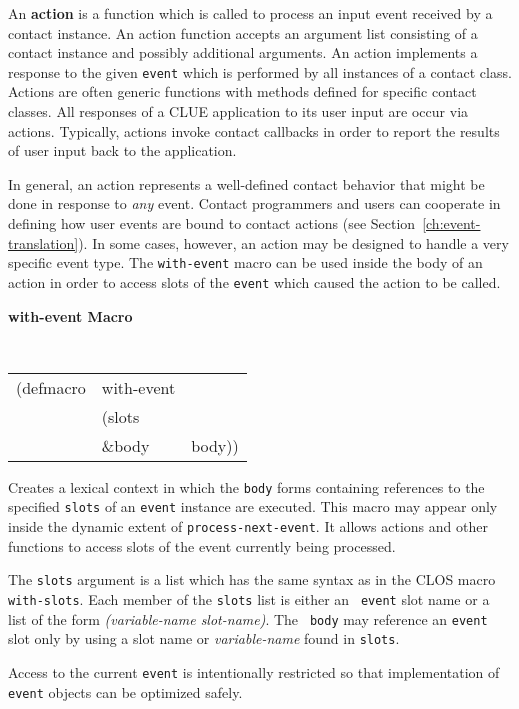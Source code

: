 
An {\bf action} is a function which is called to
process an input event received by a contact instance. An action function
accepts an argument list consisting of a contact instance and possibly
additional arguments.
An action implements a response to
the given {\tt event} which is performed by all instances of a contact class.
Actions are often generic functions with methods defined for
specific contact classes.
All responses of a CLUE application to its user input are occur via
actions.  Typically, actions invoke contact callbacks in
order to report the results of user input back to the application.

In general, an action represents a well-defined contact behavior that
might be done in response to {\em any} event.  Contact programmers and
users can cooperate in defining how user events are bound to contact
actions (see Section~\ref{ch:event-translation}). In some cases,
however, an action may be designed to handle a very specific event type.
The {\tt with-event} macro can be used inside the body of an action in
order to access slots of the {\tt event} which caused the action to be
called.

{\large {\bf with-event \hfill Macro}} 
\begin{flushright} \parbox[t]{6.125in}{
\tt
\begin{tabular}{lll}
\raggedright
(defmacro & with-event & \\ 
& (slots \\
&  \&body  & body))
\end{tabular}
\rm

}\end{flushright}

\begin{flushright} \parbox[t]{6.125in}{
Creates a lexical context in which the {\tt body} forms containing references to
the specified {\tt slots} of an {\tt event} instance are executed. This macro
may appear only inside the dynamic extent of {\tt process-next-event}.
It allows actions and other functions to access slots of the event
currently being processed.

The {\tt slots} argument is a list which has the same syntax as in the CLOS
macro {\tt with-slots}. Each member of the {\tt slots} list is either an {\tt
event} slot name or a list of the form {\em (variable-name slot-name)}. The {\tt
body} may reference an {\tt event} slot only by using a slot name or {\em
variable-name} found in {\tt slots}.

Access to the current {\tt event} is intentionally restricted so that
implementation of {\tt event} objects can be optimized safely.

}\end{flushright}



